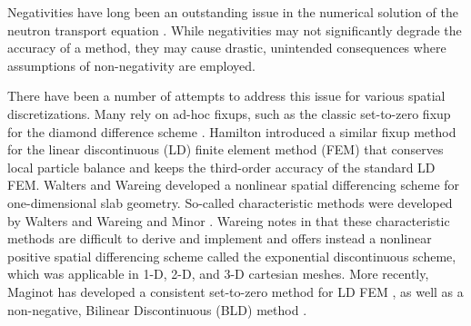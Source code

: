 Negativities have long been an outstanding issue in the numerical solution
of the neutron transport equation \cite{lanthrop}. While negativities
may not significantly degrade the accuracy of a method, they may cause
drastic, unintended consequences where assumptions of non-negativity
are employed.

There have been a number of attempts to address this issue for various
spatial discretizations. Many rely on ad-hoc fixups, such as the classic
set-to-zero fixup for the diamond difference scheme \cite{lewis}.
Hamilton \cite{hamilton} introduced a similar fixup method for the
linear discontinuous (LD) finite element method (FEM) that conserves local
particle balance and keeps the third-order accuracy of the standard
LD FEM. Walters and Wareing \cite{walters} developed a nonlinear
spatial differencing scheme for one-dimensional slab geometry.
So-called characteristic methods were developed by Walters and Wareing
\cite{walters_NC} and Minor \cite{minor}.
Wareing notes in \cite{wareing} that these characteristic methods
are difficult to derive and implement and offers instead
a nonlinear positive spatial differencing scheme called
the exponential discontinuous scheme, which was applicable in 1-D,
2-D, and 3-D cartesian meshes. More recently, Maginot has
developed a consistent set-to-zero method for LD FEM \cite{maginot},
as well as a non-negative, Bilinear Discontinuous (BLD) method
\cite{maginot_mc2015}.
